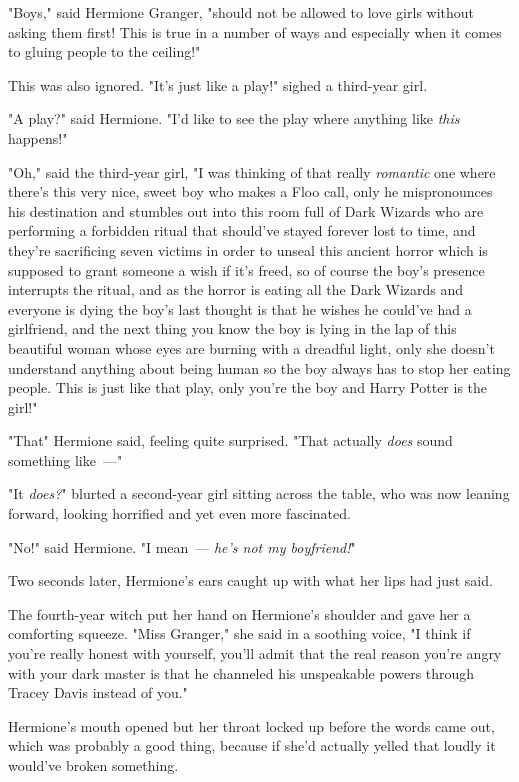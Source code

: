 "Boys," said Hermione Granger, "should not be allowed to love girls without
asking them first! This is true in a number of ways and especially when it
comes to gluing people to the ceiling!"

This was also ignored. "It's just like a play!" sighed a third-year girl.

"A play?" said Hermione. "I'd like to see the play where anything like
\emph{this} happens!"

"Oh," said the third-year girl, "I was thinking of that really \emph{romantic}
one where there's this very nice, sweet boy who makes a Floo call, only he
mispronounces his destination and stumbles out into this room full of Dark
Wizards who are performing a forbidden ritual that should've stayed forever
lost to time, and they're sacrificing seven victims in order to unseal this
ancient horror which is supposed to grant someone a wish if it's freed, so of
course the boy's presence interrupts the ritual, and as the horror is eating
all the Dark Wizards and everyone is dying the boy's last thought is that he
wishes he could've had a girlfriend, and the next thing you know the boy is
lying in the lap of this beautiful woman whose eyes are burning with a dreadful
light, only she doesn't understand anything about being human so the boy always
has to stop her eating people. This is just like that play, only you're the boy
and Harry Potter is the girl!"

"That{\el}" Hermione said, feeling quite surprised. "That actually
\emph{does} sound something like~---"

"It \emph{does?}" blurted a second-year girl sitting across the table, who was
now leaning forward, looking horrified and yet even more fascinated.

"No!" said Hermione. "I mean~--- \emph{he's not my boyfriend!}"

Two seconds later, Hermione's ears caught up with what her lips had just said.

The fourth-year witch put her hand on Hermione's shoulder and gave her a
comforting squeeze. "Miss Granger," she said in a soothing voice, "I think if
you're really honest with yourself, you'll admit that the real reason you're
angry with your dark master is that he channeled his unspeakable powers through
Tracey Davis instead of you."

Hermione's mouth opened but her throat locked up before the words came out,
which was probably a good thing, because if she'd actually yelled that loudly
it would've broken something.

